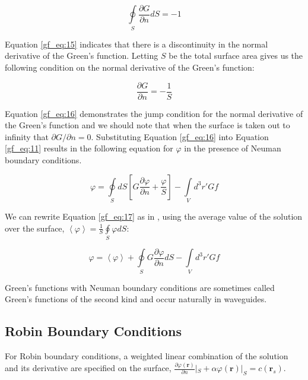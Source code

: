 \begin{equation}
\oint\limits_{S}\frac{\partial G}{\partial n} dS = -1
\label{gf_eq:15}
\end{equation}
\renewcommand{\baselinestretch}{2} \small\normalsize

Equation \ref{gf_eq:15} indicates that there is a discontinuity in the normal derivative of the Green's function. Letting $S$ be the total surface area gives us the following condition on the normal derivative of the Green's function:

\begin{equation}
\frac{\partial G}{\partial n} = -\frac{1}{S}
\label{gf_eq:16}
\end{equation}
\renewcommand{\baselinestretch}{2} \small\normalsize

Equation \ref{gf_eq:16} demonstrates the jump condition for the normal derivative of the Green's function and we should note that when the surface is taken out to infinity that $\partial G/\partial n = 0$. Substituting Equation \ref{gf_eq:16} into Equation \ref{gf_eq:11} results in the following equation for $\varphi$ in the presence of Neuman boundary conditions.

\begin{equation}
\boxed{\varphi = \oint\limits_{S}dS\left[G\frac{\partial \varphi}{\partial n} + \frac{\varphi}{S} \right] -\int\limits_{V}d^3r' Gf}
\label{gf_eq:17}
\end{equation}
\renewcommand{\baselinestretch}{2} \small\normalsize

We can rewrite Equation \ref{gf_eq:17} as in \cite{jackson_classical_em}, using the average value of the solution over the surface, $\left< \varphi\right> = \frac{1}{S}\oint\limits_{S}\varphi dS$:

\begin{equation}
\boxed{\varphi = \left<\varphi \right> + \oint\limits_{S}G\frac{\partial \varphi}{\partial n}dS  -\int\limits_{V}d^3r' Gf}
\label{gf_eq:18}
\end{equation}
\renewcommand{\baselinestretch}{2} \small\normalsize

Green's functions with Neuman boundary conditions are sometimes called Green's functions of the second kind and occur naturally in waveguides. 

\subsection {Robin Boundary Conditions}
For Robin boundary conditions, a weighted linear combination of the solution and its derivative are specified on the surface, $\frac{\partial\varphi\left(\mathbf{r}\right)}{\partial n}|_{S} +\alpha\varphi\left(\mathbf{r}\right) |_{S}= c\left(\mathbf{r}_s\right)$. 


